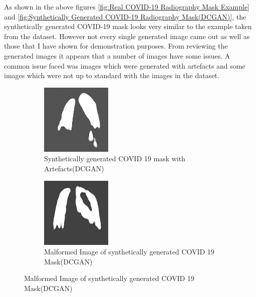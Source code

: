 As shown in the above figures \ref{fig:Real COVID-19 Radiography Mask Example} and \ref{fig:Synthetically Generated COVID-19 Radiography Mask(DCGAN)}, the synthetically generated COVID-19 mask looks very similar to the example taken from the dataset.  However not every single generated image came out as well as those that I have shown for demonstration purposes.  From reviewing the generated images it appears that a number of images have some issues.  A common issue faced was images which were generated with artefacts and some images which were not up to standard with the images in the dataset.   
 \begin{figure}[H]
    \centering
    \begin{subfigure}{.4\textwidth}
    \centering
      \includegraphics[width=.4\linewidth,keepaspectratio]{Images/ArtefactImageCOVID19MaskRadiographyDCGAN.png}
      \caption{Synthetically generated COVID 19 mask with Artefacts(DCGAN)}
      \label{fig:Image with Artefacts(Radiography DCGAN)}
    \end{subfigure}\hfill%
    \begin{subfigure}{.4\textwidth}
    \centering
      \includegraphics[width=.4\linewidth,keepaspectratio]{Images/MalformedImageCOVID19MaskRadiographyDCGAN.png}
      \caption{Malformed Image of synthetically generated COVID 19 Mask(DCGAN)}
      \label{fig:Malformed Image of COVID 19 Mask(Radiography DCGAN)}
    \end{subfigure}\hfill%
\end{figure}
